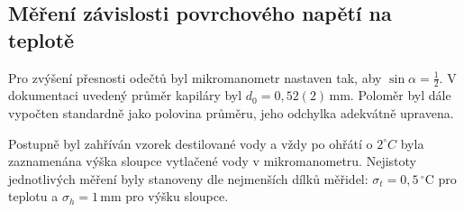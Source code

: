 \documentclass{prepareprotokol} %
\begin{document}
\subsection{Měření závislosti povrchového napětí na teplotě}

Pro zvýšení přesnosti odečtů byl mikromanometr nastaven tak, aby $\sin\alpha = \frac{1}{2}$. V dokumentaci uvedený průměr kapiláry byl $d_0 = 0{,}52(2)\,\mathrm{mm}$. Poloměr byl dále vypočten standardně jako polovina průměru, jeho odchylka adekvátně upravena.

Postupně byl zahříván vzorek destilované vody a vždy po ohřátí o $2^\circ C$ byla zaznamenána výška sloupce vytlačené vody v mikromanometru. Nejistoty jednotlivých měření byly stanoveny dle nejmenších dílků měřidel: $\sigma_t = 0{,}5\,^\circ\mathrm{C}$ pro teplotu a $\sigma_h = 1\,\mathrm{mm}$ pro výšku sloupce.
\end{document}
